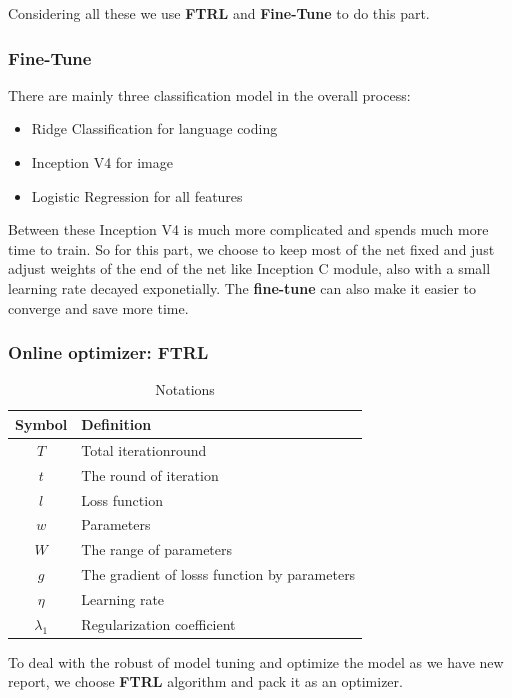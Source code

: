 \documentclass[12pt]{article}
\begin{document}
Considering all these we use \textbf{FTRL} and \textbf{Fine-Tune} to do this part.
 
\subsubsection{Fine-Tune}
There are mainly three classification model in the overall process:
\begin{itemize}
	\item Ridge Classification for language coding
	\item Inception V4 for image
	\item Logistic Regression for all features
\end{itemize}

Between these Inception V4 is much more complicated and spends much more time to train.  So for this part, we choose to keep most of the net fixed and just adjust weights of the end of the net like Inception C module, also with a small learning rate decayed exponetially. The \textbf{fine-tune} can also make it easier to converge and save more time.

\subsubsection{Online optimizer: FTRL}
\begin{table}[H]
	\begin{center}
		\caption{Notations}
		\begin{tabular}{cl}
			\toprule
			\multicolumn{1}{m{3cm}}{\centering Symbol}
			&\multicolumn{1}{m{8cm}}{\centering Definition}\\
			\midrule
			$T$& Total iterationround\\
			$t$& The round of iteration \\
			$l$&Loss function\\
			$w$&Parameters\\
			$W$&The range of parameters\\
			$g$& The gradient of losss function by parameters\\
			$\eta$&Learning rate\\
			$\lambda_1$&Regularization coefficient\\
			\bottomrule
		\end{tabular}\label{Ntt}
	\end{center}
\end{table}
To deal with the robust of model tuning and optimize the model as we have new report, we choose \textbf{FTRL}  algorithm and pack it as an optimizer.
\end{document}
